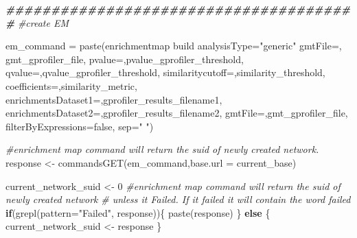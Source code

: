 \documentclass[
]{book}
\newenvironment{Shaded}{\begin{snugshade}}{\end{snugshade}}
\newcommand{\AttributeTok}[1]{\textcolor[rgb]{0.77,0.63,0.00}{#1}}
\newcommand{\CommentTok}[1]{\textcolor[rgb]{0.56,0.35,0.01}{\textit{#1}}}
\newcommand{\ControlFlowTok}[1]{\textcolor[rgb]{0.13,0.29,0.53}{\textbf{#1}}}
\newcommand{\DecValTok}[1]{\textcolor[rgb]{0.00,0.00,0.81}{#1}}
\newcommand{\DocumentationTok}[1]{\textcolor[rgb]{0.56,0.35,0.01}{\textbf{\textit{#1}}}}
\newcommand{\FunctionTok}[1]{\textcolor[rgb]{0.00,0.00,0.00}{#1}}
\newcommand{\NormalTok}[1]{#1}
\newcommand{\OtherTok}[1]{\textcolor[rgb]{0.56,0.35,0.01}{#1}}
\newcommand{\StringTok}[1]{\textcolor[rgb]{0.31,0.60,0.02}{#1}}
\begin{document}
\begin{Shaded}
\begin{Highlighting}[]
\DocumentationTok{\#\#\#\#\#\#\#\#\#\#\#\#\#\#\#\#\#\#\#\#\#\#\#\#\#\#\#\#\#\#\#\#\#\#\#\#\#\#\#}
\CommentTok{\#create EM}

\NormalTok{em\_command }\OtherTok{=} \FunctionTok{paste}\NormalTok{(}\StringTok{\textquotesingle{}enrichmentmap build analysisType="generic" gmtFile=\textquotesingle{}}\NormalTok{,}
\NormalTok{                   gmt\_gprofiler\_file,}
                   \StringTok{\textquotesingle{}pvalue=\textquotesingle{}}\NormalTok{,pvalue\_gprofiler\_threshold, }
                   \StringTok{\textquotesingle{}qvalue=\textquotesingle{}}\NormalTok{,qvalue\_gprofiler\_threshold,}
                   \StringTok{\textquotesingle{}similaritycutoff=\textquotesingle{}}\NormalTok{,similarity\_threshold,}
                   \StringTok{\textquotesingle{}coefficients=\textquotesingle{}}\NormalTok{,similarity\_metric,}
                   \StringTok{\textquotesingle{}enrichmentsDataset1=\textquotesingle{}}\NormalTok{,gprofiler\_results\_filename1, }
                   \StringTok{\textquotesingle{}enrichmentsDataset2=\textquotesingle{}}\NormalTok{,gprofiler\_results\_filename2,}
                   \StringTok{\textquotesingle{}gmtFile=\textquotesingle{}}\NormalTok{,gmt\_gprofiler\_file,}
                   \StringTok{\textquotesingle{}filterByExpressions=false\textquotesingle{}}\NormalTok{,}
                   \AttributeTok{sep=}\StringTok{" "}\NormalTok{)}

\CommentTok{\#enrichment map command will return the suid of newly created network.}
\NormalTok{response }\OtherTok{\textless{}{-}} \FunctionTok{commandsGET}\NormalTok{(em\_command,}\AttributeTok{base.url =}\NormalTok{ current\_base)}

\NormalTok{current\_network\_suid }\OtherTok{\textless{}{-}} \DecValTok{0}
\CommentTok{\#enrichment map command will return the suid of newly created network }
\CommentTok{\# unless it Failed.  If it failed it will contain the word failed}
\ControlFlowTok{if}\NormalTok{(}\FunctionTok{grepl}\NormalTok{(}\AttributeTok{pattern=}\StringTok{"Failed"}\NormalTok{, response))\{}
  \FunctionTok{paste}\NormalTok{(response)}
\NormalTok{\} }\ControlFlowTok{else}\NormalTok{ \{}
\NormalTok{  current\_network\_suid }\OtherTok{\textless{}{-}}\NormalTok{ response}
\NormalTok{\}}


\end{Highlighting}
\end{Shaded}
\end{document}
